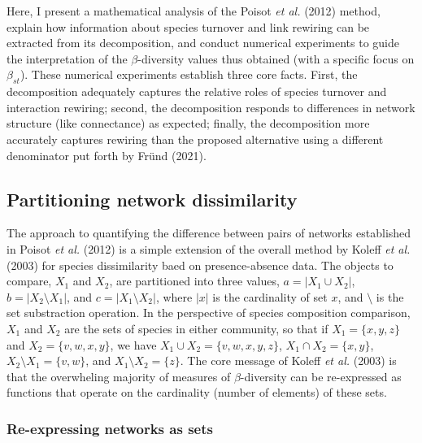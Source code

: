 \documentclass[10pt,oneside]{article}
\begin{document}
Here, I present a mathematical analysis of the Poisot \emph{et al.}
(2012) method, explain how information about species turnover and link
rewiring can be extracted from its decomposition, and conduct numerical
experiments to guide the interpretation of the \(\beta\)-diversity
values thus obtained (with a specific focus on \(\beta_{st}\)). These
numerical experiments establish three core facts. First, the
decomposition adequately captures the relative roles of species turnover
and interaction rewiring; second, the decomposition responds to
differences in network structure (like connectance) as expected;
finally, the decomposition more accurately captures rewiring than the
proposed alternative using a different denominator put forth by Fründ
(2021).

\hypertarget{partitioning-network-dissimilarity}{%
\subsection{Partitioning network
dissimilarity}\label{partitioning-network-dissimilarity}}

The approach to quantifying the difference between pairs of networks
established in Poisot \emph{et al.} (2012) is a simple extension of the
overall method by Koleff \emph{et al.} (2003) for species dissimilarity
baed on presence-absence data. The objects to compare, \(X_1\) and
\(X_2\), are partitioned into three values, \(a = |X_1 \cup X_2|\),
\(b = |X_2 \setminus X_1|\), and \(c = |X_1 \setminus X_2|\), where
\(|x|\) is the cardinality of set \(x\), and \(\setminus\) is the set
substraction operation. In the perspective of species composition
comparison, \(X_1\) and \(X_2\) are the sets of species in either
community, so that if \(X_1 = \{x, y, z\}\) and
\(X_2 = \{v, w, x, y\}\), we have \(X_1 \cup X_2 = \{v, w, x, y, z\}\),
\(X_1 \cap X_2 = \{x, y\}\), \(X_2 \setminus X_1 = \{v, w\}\), and
\(X_1 \setminus X_2 = \{z\}\). The core message of Koleff \emph{et al.}
(2003) is that the overwheling majority of measures of
\(\beta\)-diversity can be re-expressed as functions that operate on the
cardinality (number of elements) of these sets.

\hypertarget{re-expressing-networks-as-sets}{%
\subsubsection{Re-expressing networks as
sets}\label{re-expressing-networks-as-sets}}
\end{document}
